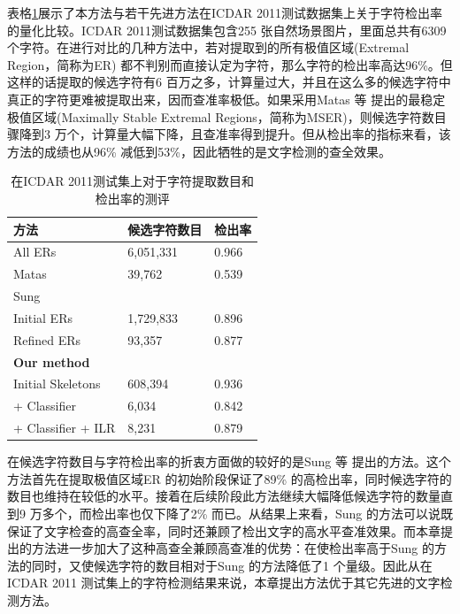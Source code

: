         表格\ref{tab.c3_icdar11}展示了本方法与若干先进方法在ICDAR 2011测试数据集上关于字符检出率的量化比较。ICDAR 2011测试数据集包含255 张自然场景图片，里面总共有6309个字符。在进行对比的几种方法中，若对提取到的所有极值区域(Extremal Region，简称为ER) 都不判别而直接认定为字符，那么字符的检出率高达96\%。但这样的话提取的候选字符有6 百万之多，计算量过大，并且在这么多的候选字符中真正的字符更难被提取出来，因而查准率极低。如果采用Matas 等\cite{Matas2004Robust} 提出的最稳定极值区域(Maximally Stable Extremal Regions，简称为MSER)，则候选字符数目骤降到3 万个，计算量大幅下降，且查准率得到提升。但从检出率的指标来看，该方法的成绩也从96\% 减低到53\%，因此牺牲的是文字检测的查全效果。

        \begin{table}[htbp]
        \centering
        \caption{在ICDAR 2011测试集上对于字符提取数目和检出率的测评}
        \begin{tabular}{p{}|p{} p{}}
        \hline
        方法 & 候选字符数目 & 检出率 \\
        \hline
        All ERs & 6,051,331 & 0.966 \\
        \hline
        Matas\cite{Matas2004Robust} & 39,762 & 0.539 \\
        \hline
        Sung\cite{Sung2015Scene} &  &  \\
        Initial ERs & 1,729,833 & 0.896 \\
        Refined ERs & 93,357 & 0.877 \\
        \hline
        \textbf{Our method}  &  &  \\
        Initial Skeletons & 608,394 & 0.936 \\
        + Classifier & 6,034 & 0.842 \\
         + Classifier + ILR & 8,231 & 0.879 \\
        \hline
        \end{tabular}
        \label{tab.c3_icdar11}
        \end{table}

        在候选字符数目与字符检出率的折衷方面做的较好的是Sung 等\cite{Sung2015Scene} 提出的方法。这个方法首先在提取极值区域ER 的初始阶段保证了89\% 的高检出率，同时候选字符的数目也维持在较低的水平。接着在后续阶段此方法继续大幅降低候选字符的数量直到9 万多个，而检出率也仅下降了2\% 而已。从结果上来看，Sung 的方法可以说既保证了文字检查的高查全率，同时还兼顾了检出文字的高水平查准效果。而本章提出的方法进一步加大了这种高查全兼顾高查准的优势：在使检出率高于Sung 的方法的同时，又使候选字符的数目相对于Sung 的方法降低了1 个量级。因此从在ICDAR 2011 测试集上的字符检测结果来说，本章提出方法优于其它先进的文字检测方法。

